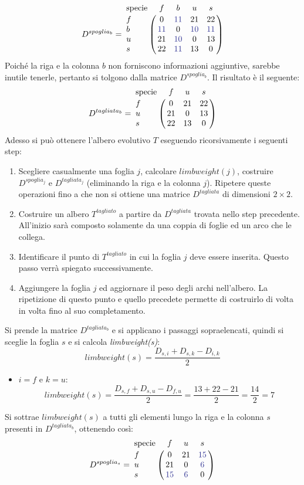 \[
D^{spoglia_{b}}= \bordermatrix{\text{specie}&f&b&u&s\cr
                f& 0 & {\color{Blue} 11} & 21 & 22\cr
                b& {\color{Blue} 11} & 0 & {\color{Blue} 10} & {\color{Blue} 11}\cr
                u& 21 & {\color{Blue} 10} & 0 & 13\cr
                s& 22 & {\color{Blue} 11} & 13 & 0}
\]
Poiché la riga e la colonna $b$ non forniscono informazioni aggiuntive, sarebbe inutile tenerle, pertanto si tolgono dalla matrice $D^{spoglia_{b}}$. Il risultato è il seguente:
\[
D^{tagliata_{b}}= \bordermatrix{\text{specie}&f&u&s\cr
                f& 0 & 21 & 22\cr
                u& 21 & 0 & 13\cr
                s& 22 & 13 & 0}
\]
Adesso si può ottenere l'albero evolutivo $T$ eseguendo ricorsivamente i seguenti step:
\begin{enumerate}
	\item Scegliere casualmente una foglia $j$, calcolare $limbweight(j)$, costruire $D^{spoglia_{j}}$ e  $D^{tagliata_{j}}$ (eliminando la riga e la colonna $j$). Ripetere queste operazioni fino a che non si ottiene una matrice $D^{tagliata}$ di dimensioni $2 \times 2$.
	\item Costruire un albero $T^{tagliato}$ a partire da $D^{tagliata}$ trovata nello step precedente. All'inizio sarà composto solamente da una coppia di foglie ed un arco che le collega.
	\item Identificare il punto di $T^{tagliato}$ in cui la foglia $j$ deve essere inserita. Questo passo verrà spiegato successivamente.
	\item Aggiungere la foglia $j$ ed aggiornare il peso degli archi nell'albero. La ripetizione di questo punto e quello precedete permette di costruirlo di volta in volta fino al suo completamento.
\end{enumerate}
Si prende la matrice $D^{tagliata_{b}}$ e si applicano i passaggi sopraelencati, quindi si sceglie la foglia $s$ e si calcola \textit{limbweight(s)}:
\[limbweight(s)=\frac{D_{s,i}+D_{s,k}-D_{i,k}}{2}\]
\begin{itemize}
	\item $i=f$ e $k=u$:
	\[limbweight(s)=\frac{D_{s,f}+D_{s,u}-D_{f,u}}{2}=\frac{13+22-21}{2}=\frac{14}{2}=7\]
\end{itemize}
Si sottrae $limbweight(s)$ a tutti gli elementi lungo la riga e la colonna $s$ presenti in $D^{tagliata_{b}}$, ottenendo così:
\[
D^{spoglia_{s}}= \bordermatrix{\text{specie}&f&u&s\cr
                f& 0 & 21 & {\color{Blue} 15}\cr
                u& 21 & 0 & {\color{Blue} 6}\cr
                s& {\color{Blue} 15} & {\color{Blue} 6} & 0}
\]
